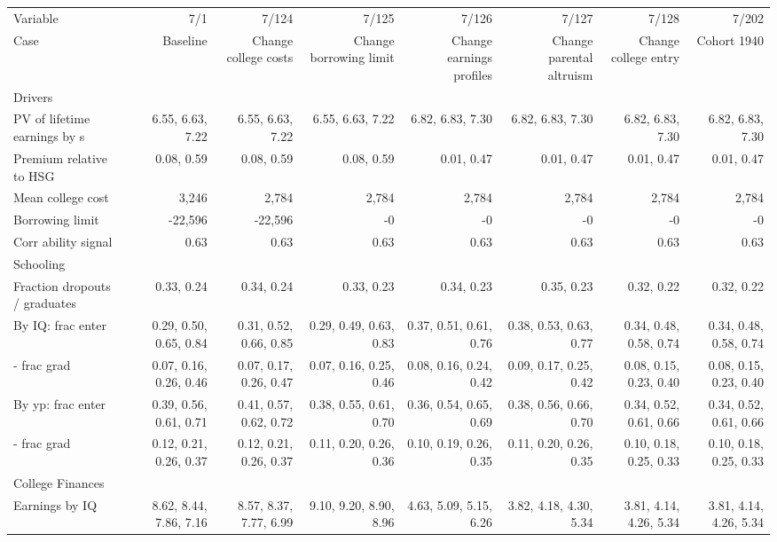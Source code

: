 \begin{tabular}{lrrrrrrr}
\hline
Variable & 7/1  & 7/124  & 7/125  & 7/126  & 7/127  & 7/128  & 7/202  \\ 
Case & Baseline  & Change college costs  & Change borrowing limit  & Change earnings profiles  & Change parental altruism  & Change college entry  & Cohort 1940  \\ 
Drivers &   &   &   &   &   &   &   \\ 
PV of lifetime earnings by s & 6.55, 6.63, 7.22  & 6.55, 6.63, 7.22  & 6.55, 6.63, 7.22  & 6.82, 6.83, 7.30  & 6.82, 6.83, 7.30  & 6.82, 6.83, 7.30  & 6.82, 6.83, 7.30  \\ 
Premium relative to HSG & 0.08, 0.59  & 0.08, 0.59  & 0.08, 0.59  & 0.01, 0.47  & 0.01, 0.47  & 0.01, 0.47  & 0.01, 0.47  \\ 
Mean college cost & 3,246  & 2,784  & 2,784  & 2,784  & 2,784  & 2,784  & 2,784  \\ 
Borrowing limit & -22,596  & -22,596  & -0  & -0  & -0  & -0  & -0  \\ 
Corr ability signal & 0.63  & 0.63  & 0.63  & 0.63  & 0.63  & 0.63  & 0.63  \\ 
\hline
Schooling &   &   &   &   &   &   &   \\ 
Fraction dropouts / graduates & 0.33, 0.24  & 0.34, 0.24  & 0.33, 0.23  & 0.34, 0.23  & 0.35, 0.23  & 0.32, 0.22  & 0.32, 0.22  \\ 
By IQ: frac enter & 0.29, 0.50, 0.65, 0.84  & 0.31, 0.52, 0.66, 0.85  & 0.29, 0.49, 0.63, 0.83  & 0.37, 0.51, 0.61, 0.76  & 0.38, 0.53, 0.63, 0.77  & 0.34, 0.48, 0.58, 0.74  & 0.34, 0.48, 0.58, 0.74  \\ 
- frac grad & 0.07, 0.16, 0.26, 0.46  & 0.07, 0.17, 0.26, 0.47  & 0.07, 0.16, 0.25, 0.46  & 0.08, 0.16, 0.24, 0.42  & 0.09, 0.17, 0.25, 0.42  & 0.08, 0.15, 0.23, 0.40  & 0.08, 0.15, 0.23, 0.40  \\ 
By yp: frac enter & 0.39, 0.56, 0.61, 0.71  & 0.41, 0.57, 0.62, 0.72  & 0.38, 0.55, 0.61, 0.70  & 0.36, 0.54, 0.65, 0.69  & 0.38, 0.56, 0.66, 0.70  & 0.34, 0.52, 0.61, 0.66  & 0.34, 0.52, 0.61, 0.66  \\ 
- frac grad & 0.12, 0.21, 0.26, 0.37  & 0.12, 0.21, 0.26, 0.37  & 0.11, 0.20, 0.26, 0.36  & 0.10, 0.19, 0.26, 0.35  & 0.11, 0.20, 0.26, 0.35  & 0.10, 0.18, 0.25, 0.33  & 0.10, 0.18, 0.25, 0.33  \\ 
\hline
College Finances &   &   &   &   &   &   &   \\ 
Earnings by IQ & 8.62, 8.44, 7.86, 7.16  & 8.57, 8.37, 7.77, 6.99  & 9.10, 9.20, 8.90, 8.96  & 4.63, 5.09, 5.15, 6.26  & 3.82, 4.18, 4.30, 5.34  & 3.81, 4.14, 4.26, 5.34  & 3.81, 4.14, 4.26, 5.34  \\ 

\end{tabular}
